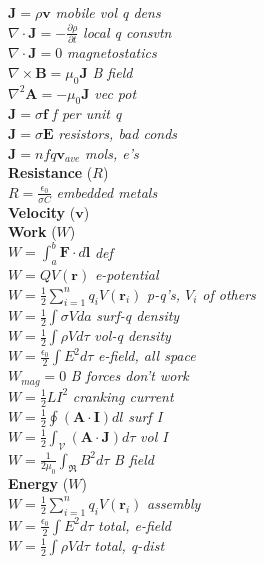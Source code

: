\documentclass[9pt]{extarticle}
\begin{document}
\begin{multicols}{3}
$\mathbf{J} = \rho\mathbf{v}$ \textit{mobile vol q dens} \\
$\nabla\cdot\mathbf{J} = -\frac{\partial\rho}{\partial t}$ \textit{local q consvtn} \\
$\nabla\cdot\mathbf{J} = 0$ \textit{magnetostatics} \\
$\nabla\times\mathbf{B} = \mu_{0}\mathbf{J}$ \textit{B field} \\
$\nabla^{2}\mathbf{A} = -\mu_{0}\mathbf{J}$ \textit{vec pot} \\
$\mathbf{J} = \sigma\mathbf{f}$ \textit{f per unit q} \\
$\mathbf{J}=\sigma\mathbf{E}$ \textit{resistors, bad conds} \\
$\mathbf{J} = nfq\mathbf{v}_{ave}$ \textit{mols, e's} \\
\textbf{Resistance} ($R$) \\
$R = \frac{\epsilon_{0}}{\sigma C}$ \textit{embedded metals} \\
\textbf{Velocity} ($\mathbf{v}$) \\
\textbf{Work} ($W$)\\
$W = \int_{a}^{b}\mathbf{F}\cdot d\mathbf{l}$ \textit{def} \\
$W = QV(\mathbf{r})$ \textit{e-potential} \\
$W = \frac{1}{2}\sum_{i=1}^{n}q_{i}V(\mathbf{r}_{i})$ \textit{p-q's, $V_{i}$  of others} \\
$W = \frac{1}{2}\int\sigma V da$ \textit{surf-q density} \\
$W = \frac{1}{2}\int\rho V d\tau$ \textit{vol-q density} \\
$W = \frac{\epsilon_{0}}{2}\int E^{2}d\tau $ \textit{e-field, all space} \\
$W_{mag}=0$ \textit{B forces don't work} \\
$W = \frac{1}{2}LI^{2}$ \textit{cranking current} \\
$W = \frac{1}{2}\oint(\mathbf{A}\cdot\mathbf{I})dl$ \textit{surf I} \\
$W = \frac{1}{2}\int_{\mathcal{V}}(\mathbf{A}\cdot\mathbf{J})d\tau$ \textit{vol I} \\
$W = \frac{1}{2\mu_{0}}\int_{\Re}B^{2}d\tau$ \textit{B field} \\
\textbf{Energy} ($W$) \\
$W = \frac{1}{2}\sum_{i=1}^{n}q_{i}V(\mathbf{r}_{i})$ \textit{assembly} \\
$W = \frac{\epsilon_{0}}{2}\int E^{2}d\tau $ \textit{total, e-field} \\
$W = \frac{1}{2}\int\rho Vd\tau$ \textit{total, q-dist} \\

\end{multicols}
\end{document}
